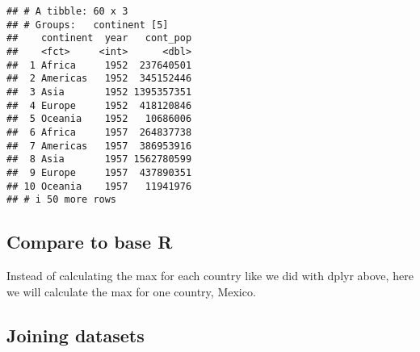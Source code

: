 \documentclass[
]{article}
\newenvironment{Shaded}{\begin{snugshade}}{\end{snugshade}}
\newcommand{\AttributeTok}[1]{\textcolor[rgb]{0.13,0.29,0.53}{#1}}
\newcommand{\CommentTok}[1]{\textcolor[rgb]{0.56,0.35,0.01}{\textit{#1}}}
\newcommand{\ConstantTok}[1]{\textcolor[rgb]{0.56,0.35,0.01}{#1}}
\newcommand{\FunctionTok}[1]{\textcolor[rgb]{0.13,0.29,0.53}{\textbf{#1}}}
\newcommand{\NormalTok}[1]{#1}
\newcommand{\OtherTok}[1]{\textcolor[rgb]{0.56,0.35,0.01}{#1}}
\newcommand{\SpecialCharTok}[1]{\textcolor[rgb]{0.81,0.36,0.00}{\textbf{#1}}}
\newcommand{\StringTok}[1]{\textcolor[rgb]{0.31,0.60,0.02}{#1}}
\begin{document}
\begin{verbatim}
## # A tibble: 60 x 3
## # Groups:   continent [5]
##    continent  year   cont_pop
##    <fct>     <int>      <dbl>
##  1 Africa     1952  237640501
##  2 Americas   1952  345152446
##  3 Asia       1952 1395357351
##  4 Europe     1952  418120846
##  5 Oceania    1952   10686006
##  6 Africa     1957  264837738
##  7 Americas   1957  386953916
##  8 Asia       1957 1562780599
##  9 Europe     1957  437890351
## 10 Oceania    1957   11941976
## # i 50 more rows
\end{verbatim}

\subsection{Compare to base R}\label{compare-to-base-r}

Instead of calculating the max for each country like we did with dplyr
above, here we will calculate the max for one country, Mexico.

\begin{Shaded}
\end{Shaded}

\subsection{Joining datasets}\label{joining-datasets}
\end{document}
